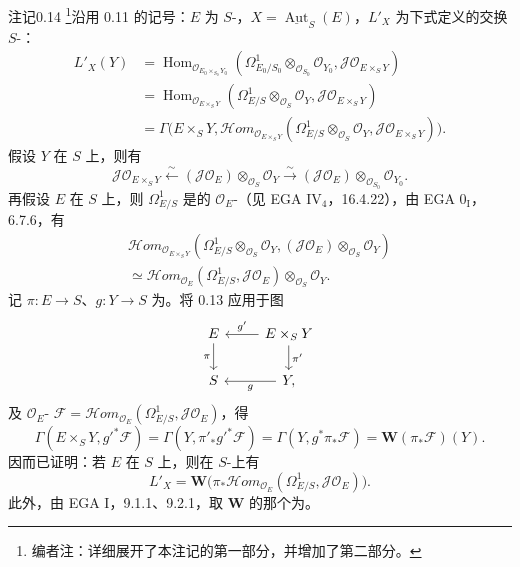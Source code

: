 \begin{SGAresult}{注记}{0.14}
\footnote{编者注：详细展开了本注记的第一部分，并增加了第二部分。}沿用 0.11 的记号：$E$ 为 $S$-，$X=\underline{\operatorname{Aut}}_S(E)$，$L'_X$ 为下式定义的交换 $S$-：
\[\begin{aligned}
L'_X(Y)&=\operatorname{Hom}_{\mathcal O_{E_0\times_{S_0}Y_0}}(\Omega^1_{E_0/S_0}\otimes_{\mathcal O_{S_0}}\mathcal O_{Y_0},\mathcal J\mathcal O_{E\times_S Y})\\
&=\operatorname{Hom}_{\mathcal O_{E\times_S Y}}(\Omega^1_{E/S}\otimes_{\mathcal O_S}\mathcal O_Y,\mathcal J\mathcal O_{E\times_S Y})\\
&=\Gamma\bigl(E\times_S Y,\mathcal Hom_{\mathcal O_{E\times_S Y}}(\Omega^1_{E/S}\otimes_{\mathcal O_S}\mathcal O_Y,\mathcal J\mathcal O_{E\times_S Y})\bigr).
\end{aligned}\]
假设 $Y$ 在 $S$ 上，则有
\[\mathcal J\mathcal O_{E\times_S Y}\xleftarrow{\sim}(\mathcal J\mathcal O_E)\otimes_{\mathcal O_S}\mathcal O_Y\xrightarrow{\sim}(\mathcal J\mathcal O_E)\otimes_{\mathcal O_{S_0}}\mathcal O_{Y_0}.\]
再假设 $E$ 在 $S$ 上，则 $\Omega^1_{E/S}$ 是的 $\mathcal O_E$-（见 EGA IV$_4$，16.4.22），由 EGA 0$_{\mathrm I}$，6.7.6，有
\[\begin{aligned}
\mathcal Hom_{\mathcal O_{E\times_S Y}}(\Omega^1_{E/S}\otimes_{\mathcal O_S}\mathcal O_Y,(\mathcal J\mathcal O_E)\otimes_{\mathcal O_S}\mathcal O_Y)\\
\simeq\mathcal Hom_{\mathcal O_E}(\Omega^1_{E/S},\mathcal J\mathcal O_E)\otimes_{\mathcal O_S}\mathcal O_Y.
\end{aligned}\]
记 $\pi:E\to S$、$g:Y\to S$ 为。将 0.13 应用于图
\[\begin{tikzcd}E\arrow[d,"\pi"']&E\times_S Y\arrow[l,"g'"']\arrow[d,"\pi'"]\\S&Y\arrow[l,"g"],\end{tikzcd}\]
及 $\mathcal O_E$- $\mathcal F=\mathcal Hom_{\mathcal O_E}(\Omega^1_{E/S},\mathcal J\mathcal O_E)$，得
\[\Gamma(E\times_S Y,g'^*\mathcal F)=\Gamma(Y,\pi'_*g'^*\mathcal F)=\Gamma(Y,g^*\pi_*\mathcal F)=\mathbf W(\pi_*\mathcal F)(Y).\]
因而已证明：若 $E$ 在 $S$ 上，则在 $S$-上有
\[L'_X=\mathbf W\bigl(\pi_*\mathcal Hom_{\mathcal O_E}(\Omega^1_{E/S},\mathcal J\mathcal O_E)\bigr).\tag{0.14.1}\]
此外，由 EGA I，9.1.1、9.2.1，取 $\mathbf W$ 的那个为。


\end{SGAresult}
